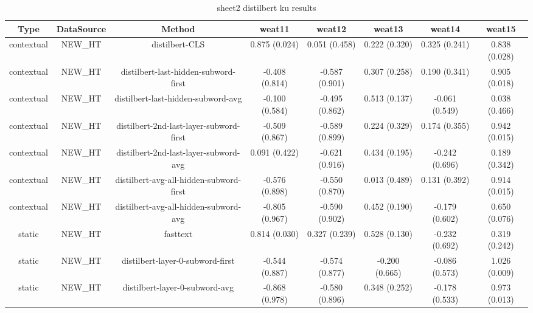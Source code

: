 \begin{sidewaystable}[htb]
    \centering
    \caption{sheet2 distilbert ku results}
    \label{appendix_tab:sheet2_distilbert_ku_results}
    \small
    \begin{tabular}{@{}cccccccc@{}}
        \toprule
        Type & DataSource & Method & weat11 & weat12 & weat13 & weat14 & weat15 \\
        \midrule
        contextual & NEW\_HT & distilbert-CLS & 0.875 (0.024) & 0.051 (0.458) & 0.222 (0.320) & 0.325 (0.241) & 0.838 (0.028) \\
        contextual & NEW\_HT & distilbert-last-hidden-subword-first & -0.408 (0.814) & -0.587 (0.901) & 0.307 (0.258) & 0.190 (0.341) & 0.905 (0.018) \\
        contextual & NEW\_HT & distilbert-last-hidden-subword-avg & -0.100 (0.584) & -0.495 (0.862) & 0.513 (0.137) & -0.061 (0.549) & 0.038 (0.466) \\
        contextual & NEW\_HT & distilbert-2nd-last-layer-subword-first & -0.509 (0.867) & -0.589 (0.899) & 0.224 (0.329) & 0.174 (0.355) & 0.942 (0.015) \\
        contextual & NEW\_HT & distilbert-2nd-last-layer-subword-avg & 0.091 (0.422) & -0.621 (0.916) & 0.434 (0.195) & -0.242 (0.696) & 0.189 (0.342) \\
        contextual & NEW\_HT & distilbert-avg-all-hidden-subword-first & -0.576 (0.898) & -0.550 (0.870) & 0.013 (0.489) & 0.131 (0.392) & 0.914 (0.015) \\
        contextual & NEW\_HT & distilbert-avg-all-hidden-subword-avg & -0.805 (0.967) & -0.590 (0.902) & 0.452 (0.190) & -0.179 (0.602) & 0.650 (0.076) \\
        static & NEW\_HT & fasttext & 0.814 (0.030) & 0.327 (0.239) & 0.528 (0.130) & -0.232 (0.692) & 0.319 (0.242) \\
        static & NEW\_HT & distilbert-layer-0-subword-first & -0.544 (0.887) & -0.574 (0.877) & -0.200 (0.665) & -0.086 (0.573) & 1.026 (0.009) \\
        static & NEW\_HT & distilbert-layer-0-subword-avg & -0.868 (0.978) & -0.580 (0.896) & 0.348 (0.252) & -0.178 (0.533) & 0.973 (0.013) \\
        \bottomrule
    \end{tabular}
\end{sidewaystable}